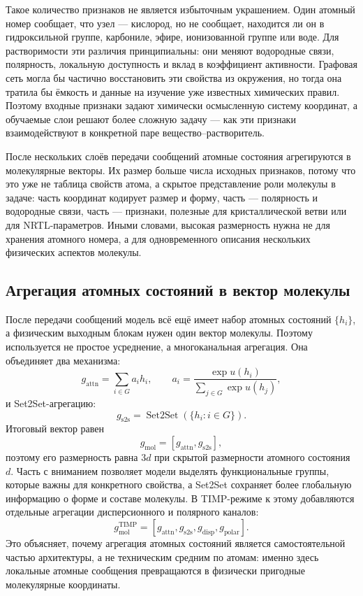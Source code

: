 \documentclass[11pt]{article}
\theoremstyle{definition}
\begin{document}
Такое количество признаков не является избыточным украшением. Один атомный номер сообщает, что узел --- кислород, но не сообщает, находится ли он в гидроксильной группе, карбониле, эфире, ионизованной группе или воде. Для растворимости эти различия принципиальны: они меняют водородные связи, полярность, локальную доступность и вклад в коэффициент активности. Графовая сеть могла бы частично восстановить эти свойства из окружения, но тогда она тратила бы ёмкость и данные на изучение уже известных химических правил. Поэтому входные признаки задают химически осмысленную систему координат, а обучаемые слои решают более сложную задачу --- как эти признаки взаимодействуют в конкретной паре вещество--растворитель.

После нескольких слоёв передачи сообщений атомные состояния агрегируются в молекулярные векторы. Их размер больше числа исходных признаков, потому что это уже не таблица свойств атома, а скрытое представление роли молекулы в задаче: часть координат кодирует размер и форму, часть --- полярность и водородные связи, часть --- признаки, полезные для кристаллической ветви или для NRTL-параметров. Иными словами, высокая размерность нужна не для хранения атомного номера, а для одновременного описания нескольких физических аспектов молекулы.

\subsection{Агрегация атомных состояний в вектор молекулы}

После передачи сообщений модель всё ещё имеет набор атомных состояний $\{h_i\}$, а физическим выходным блокам нужен один вектор молекулы. Поэтому используется не простое усреднение, а многоканальная агрегация. Она объединяет два механизма:
\begin{equation*}
    g_{\mathrm{attn}}
    =
    \sum_{i\in G} a_i h_i,
    \qquad
    a_i=
    \frac{\exp u(h_i)}{\sum_{j\in G}\exp u(h_j)},
\end{equation*}
и Set2Set-агрегацию:
\begin{equation*}
    g_{\mathrm{s2s}}=\operatorname{Set2Set}(\{h_i:i\in G\}).
\end{equation*}
Итоговый вектор равен
\begin{equation*}
    g_{\mathrm{mol}}=[g_{\mathrm{attn}},g_{\mathrm{s2s}}],
\end{equation*}
поэтому его размерность равна $3d$ при скрытой размерности атомного состояния $d$. Часть с вниманием позволяет модели выделять функциональные группы, которые важны для конкретного свойства, а Set2Set сохраняет более глобальную информацию о форме и составе молекулы. В TIMP-режиме к этому добавляются отдельные агрегации дисперсионного и полярного каналов:
\begin{equation*}
    g_{\mathrm{mol}}^{\mathrm{TIMP}}
    =
    [g_{\mathrm{attn}},g_{\mathrm{s2s}},g_{\mathrm{disp}},g_{\mathrm{polar}}].
\end{equation*}
Это объясняет, почему агрегация атомных состояний является самостоятельной частью архитектуры, а не техническим средним по атомам: именно здесь локальные атомные сообщения превращаются в физически пригодные молекулярные координаты.
\end{document}
